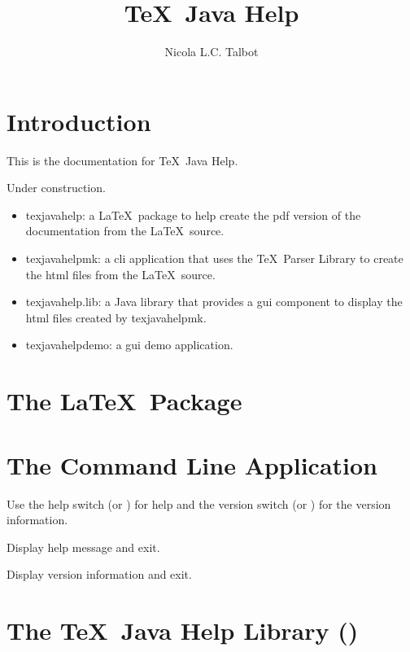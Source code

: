 \documentclass[toc=listof]{scrreport}
\title{\TeX\ Java Help}
\author{Nicola L.C. Talbot}
\begin{document}
\maketitle
\tableofcontents

\chapter{Introduction}
\label{sec:intro}

This is the documentation for \TeX\ Java Help.

\begin{warning}
Under construction.
\end{warning}

\begin{itemize}
\item \gls{texjavahelp}: a \LaTeX\ package to help create the \gls{pdf} version of
the documentation from the \LaTeX\ source.

\item \gls{texjavahelpmk}: a \gls{cli} application that uses the \TeX\ Parser
Library to create the \gls{html} files from the \LaTeX\ source.

\item \gls{texjavahelp.lib}: a Java library that provides a \gls{gui} 
component to display the \gls{html} files created by \gls{texjavahelpmk}.

\item \gls{texjavahelpdemo}: a \gls{gui} demo application.
\end{itemize}

\chapter{The  \LaTeX\ Package}
\label{sec:texjavahelpsty}


\chapter{The  Command Line Application}
\label{sec:texjavahelpmk}


Use the \gls{help} switch (or ) for help and the
\gls{version} switch (or ) for the version information.

Display help message and exit.

Display version information and exit.

\chapter{The \TeX\ Java Help Library ()}


\printterms

\printindex
\end{document}
